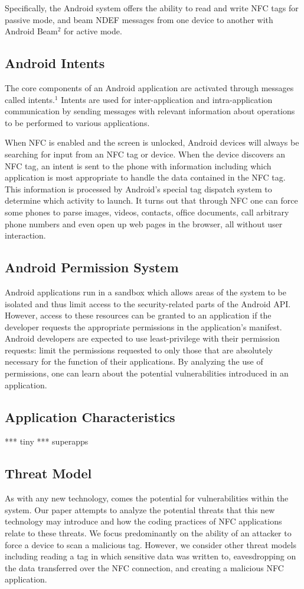 \documentclass[12pt]{article}
\begin{document}
Specifically, the Android system offers the ability to read and write NFC tags for passive mode, and beam NDEF messages from one device to another with Android Beam$^{2}$ for active mode. 

\subsection{Android Intents}
The core components of an Android application are activated through messages called intents.$^{1}$ Intents are used for inter-application and intra-application communication by sending messages with relevant information about operations to be performed to various applications.  

When NFC is enabled and the screen is unlocked, Android devices will always be searching for input from an NFC tag or device. When the device discovers an NFC tag, an intent is sent to the phone with information including which application is most appropriate to handle the data contained in the NFC tag. This information is processed by Android's special tag dispatch system to determine which activity to launch. It turns out that through NFC one can force some phones to parse images, videos, contacts, ofﬁce documents, call arbitrary phone numbers and even open up web pages in the browser, all without user interaction.  

\subsection{Android Permission System}
Android applications run in a sandbox which allows areas of the system to be isolated and thus limit access to the security-related parts of the Android API. However, access to these resources can be granted to an application if the developer requests the appropriate permissions in the application's manifest. Android developers are expected to use least-privilege with their permission requests: limit the permissions requested to only those that are absolutely necessary for the function of their applications. By analyzing the use of permissions, one can learn about the potential vulnerabilities introduced in an application. 

\subsection{Application Characteristics}
*** tiny
*** superapps

\subsection{Threat Model}
As with any new technology, comes the potential for vulnerabilities within the system. Our paper attempts to analyze the potential threats that this new technology may introduce and how the coding practices of NFC applications relate to these threats. We focus predominantly on the ability of an attacker to force a device to scan a malicious tag. However, we consider other threat models including reading a tag in which sensitive data was written to, eavesdropping on the data transferred over the NFC connection, and creating a malicious NFC application. 
\end{document}
